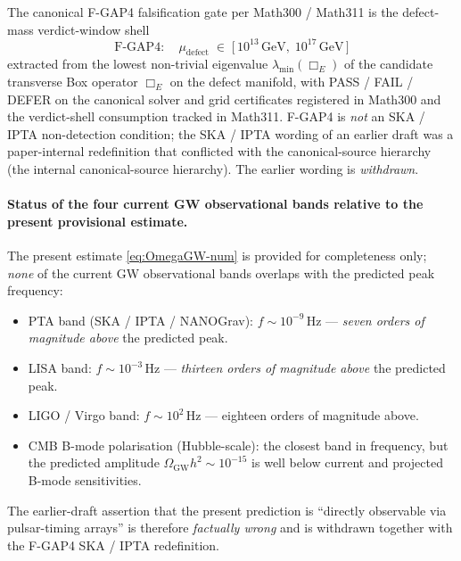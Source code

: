 \begin{remark}\label{rmk:not-SKA-IPTA}
The canonical F-GAP4 falsification gate per Math300 / Math311 is the
defect-mass verdict-window shell
\begin{equation}\label{eq:FGAP4}
  \boxed{\;
  \text{F-GAP4}: \quad
  \mu_{\mathrm{defect}}
  \;\in\;
  \big[\,10^{13}\,\mathrm{GeV},\;10^{17}\,\mathrm{GeV}\,\big]
  \;}
\end{equation}
extracted from the lowest non-trivial eigenvalue
$\lambda_{\min}(\Box_{E})$ of the candidate transverse Box operator
$\Box_{E}$ on the defect manifold, with PASS / FAIL / DEFER on
the canonical solver and grid certificates registered in Math300 and
the verdict-shell consumption tracked in Math311. F-GAP4 is
\emph{not} an SKA / IPTA non-detection condition; the
SKA / IPTA wording of an earlier draft was a paper-internal
redefinition that conflicted with the canonical-source hierarchy
(the internal canonical-source hierarchy). The earlier wording is \emph{withdrawn}.
\end{remark}

\paragraph{Status of the four current GW observational bands relative
to the present provisional estimate.}
The present estimate \eqref{eq:OmegaGW-num} is provided for
completeness only; \emph{none} of the current GW observational bands
overlaps with the predicted peak frequency:
\begin{itemize}
  \item PTA band (SKA / IPTA / NANOGrav): $f\sim 10^{-9}\,\mathrm{Hz}$
    --- \emph{seven orders of magnitude above} the predicted peak.
  \item LISA band: $f \sim 10^{-3}\,\mathrm{Hz}$ ---
    \emph{thirteen orders of magnitude above} the predicted peak.
  \item LIGO / Virgo band: $f \sim 10^{2}\,\mathrm{Hz}$ ---
    eighteen orders of magnitude above.
  \item CMB B-mode polarisation (Hubble-scale): the closest band in
    frequency, but the predicted amplitude
    $\Omega_{\mathrm{GW}}h^2 \sim 10^{-15}$ is well below current
    and projected B-mode sensitivities.
\end{itemize}
The earlier-draft assertion that the present prediction is
``directly observable via pulsar-timing arrays'' is therefore
\emph{factually wrong} and is withdrawn together with the F-GAP4
SKA / IPTA redefinition.

